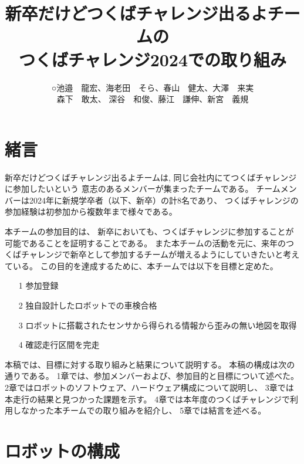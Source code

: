 \documentclass[twocolumn,9pt]{jsproceedings}
\title{新卒だけどつくばチャレンジ出るよチームの\\つくばチャレンジ2024での取り組み}
\author{○池邉　龍宏\authorrefmark{1}、海老田　そら\authorrefmark{1}、春山　健太\authorrefmark{1}、大澤　来実\authorrefmark{1}\\森下　敢太\authorrefmark{1}、
深谷　和俊\authorrefmark{1}、藤江　謙伸\authorrefmark{1}、新宮　義規\authorrefmark{1}}
\affiliation{新卒だけどつくばチャレンジ出るよ}
\begin{document}
\maketitle


\section{緒言}\label{sec:1}

新卒だけどつくばチャレンジ出るよチームは,
同じ会社内にてつくばチャレンジに参加したいという
意志のあるメンバーが集まったチームである。
チームメンバーは2024年に新規学卒者（以下、新卒）の計8名であり、
つくばチャレンジの参加経験は初参加から複数年まで様々である。

本チームの参加目的は、
新卒においても、つくばチャレンジに参加することが可能であることを証明することである。
また本チームの活動を元に、来年のつくばチャレンジで新卒として参加するチームが増えるようにしていきたいと考えている。
この目的を達成するために、本チームでは以下を目標と定めた。
\begin{itemize}
  \item[1] 参加登録
  \item[2] 独自設計したロボットでの車検合格
  \item[3] ロボットに搭載されたセンサから得られる情報から歪みの無い地図を取得
  \item[4] 確認走行区間を完走
\end{itemize}


本稿では、目標に対する取り組みと結果について説明する。
本稿の構成は次の通りである。
1章では、参加メンバーおよび、参加目的と目標について述べた。
2章ではロボットのソフトウェア、ハードウェア構成について説明し、
3章では本走行の結果と見つかった課題を示す。
4章では本年度のつくばチャレンジで利用しなかった本チームでの取り組みを紹介し、
5章では結言を述べる。

\section{ロボットの構成}
\end{document}
